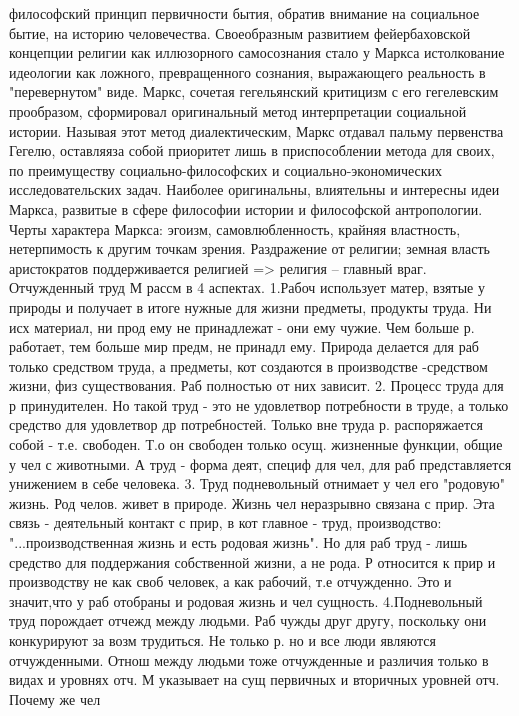 \documentclass[12pt]{article}
\begin{document}
философский принцип первичности бытия, обратив внимание на социальное бытие, на историю человечества.
Своеобразным развитием фейербаховской концепции религии как иллюзорного самосознания стало у Маркса
истолкование идеологии как ложного, превращенного сознания, выражающего реальность в "перевернутом"
виде.
Маркс,  сочетая  гегельянский  критицизм  с  его  гегелевским  прообразом,  сформировал  оригинальный  метод
интерпретации социальной истории. Называя этот метод диалектическим, Маркс отдавал пальму первенства
Гегелю, оставляяза собой приоритет лишь в приспособлении метода для своих, по преимуществу социально-философских  и  социально-экономических  исследовательских  задач.  Наиболее  оригинальны,  влиятельны  и
интересны идеи Маркса, развитые в сфере философии истории и философской антропологии. 
Черты  характера  Маркса:  эгоизм,  самовлюбленность,  крайняя  властность,  нетерпимость  к  другим  точкам
зрения. Раздражение от религии; земная власть аристократов поддерживается религией => религия – главный
враг.
Отчужденный труд М рассм в 4 аспектах.
1.Рабоч использует матер, взятые у природы и получает в итоге нужные для жизни предметы, продукты труда.
Ни исх материал, ни прод ему не принадлежат - они ему чужие. Чем больше р. работает, тем больше мир предм,
не принадл ему. Природа делается для раб только средством труда, а предметы, кот создаются в производстве -средством жизни, физ существования. Раб полностью от них зависит.
2. Процесс труда для р принудителен. Но такой труд - это не удовлетвор потребности в труде, а только средство
для удовлетвор др потребностей. Только вне труда р. распоряжается собой - т.е. свободен. Т.о он свободен
только осущ. жизненные функции, общие у чел с животными. А труд - форма деят, специф для чел, для раб
представляется унижением в себе человека.
3. Труд подневольный отнимает у чел его "родовую" жизнь. Род челов. живет в природе. Жизнь чел неразрывно
связана с прир. Эта связь - деятельный контакт с прир, в кот главное - труд, производство: "...производственная
жизнь и есть родовая жизнь". Но для раб труд - лишь средство для поддержания собственной жизни, а не рода.
Р относится к прир и производству не как своб человек, а как рабочий, т.е отчужденно. Это и значит,что у раб
отобраны и родовая жизнь и чел сущность.
4.Подневольный труд порождает отчежд между людьми. Раб чужды друг другу, поскольку они конкурируют за
возм трудиться.
Не только р. но и все люди являются отчужденными. Отнош между людьми тоже отчужденные и различия
только в видах и уровнях отч. М указывает на сущ первичных и вторичных уровней отч. Почему же чел
\end{document}
